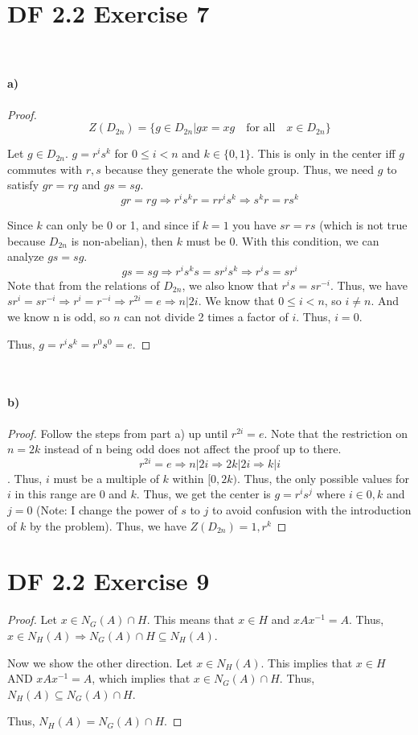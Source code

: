 \documentclass{article}
\begin{document}
\section{DF 2.2 Exercise 7}
~\paragraph{a)}
\begin{proof}
\[
Z(D_{2n}) = \{g \in D_{2n} | gx=xg \quad \textrm{for all} \quad x\in D_{2n}\}
\]

Let $g \in D_{2n}$. $g=r^is^k$ for $0 \leq i < n$ and $k \in \{0, 1\}$. This is only in the center iff $g$ commutes with $r, s$ because they generate the whole group. Thus, we need $g$ to satisfy $gr=rg$ and $gs=sg$.
\[
gr=rg \Rightarrow r^is^kr=rr^is^k \Rightarrow s^kr = rs^k
\]

Since $k$ can only be 0 or 1, and since if $k=1$ you have $sr = rs$ (which is not true because $D_{2n}$ is non-abelian), then $k$ must be 0. With this condition, we can analyze $gs=sg$.
\[
gs=sg \Rightarrow r^is^ks=sr^is^k \Rightarrow r^is=sr^i
\]
Note that from the relations of $D_{2n}$, we also know that $r^is=sr^{-i}$. Thus, we have $sr^i=sr^{-i} \Rightarrow r^i=r^{-i} \Rightarrow r^{2i}=e \Rightarrow n|2i$. We know that $0\leq i < n$, so $i\neq n$. And we know n is odd, so $n$ can not divide 2 times a factor of $i$. Thus, $i=0$.

Thus, $g=r^is^k=r^0s^0=e$.
\end{proof}
~\paragraph{b)}
\begin{proof}
Follow the steps from part a) up until $r^{2i} = e$. Note that the restriction on $n=2k$ instead of n being odd does not affect the proof up to there. 
\[r^{2i} = e \Rightarrow n|2i \Rightarrow 2k|2i \Rightarrow k|i\]. 
Thus, $i$ must be a multiple of $k$ within $[0, 2k)$. Thus, the only possible values for $i$ in this range are 0 and $k$. Thus, we get the center is $g=r^is^j$ where $i \in {0, k}$ and $j=0$ (Note: I change the power of $s$ to $j$ to avoid confusion with the introduction of $k$ by the problem).
Thus, we have $Z(D_{2n})={1, r^k}$
\end{proof}

\section{DF 2.2 Exercise 9}
\begin{proof}
Let $x \in N_G(A) \cap H$. This means that $x \in H$ and $xAx^{-1}=A$. Thus, $x \in N_H(A) \Rightarrow N_G(A)\cap H \subseteq N_H(A)$. 

Now we show the other direction. Let $x \in N_H(A)$. This implies that $x \in H$ AND $xAx^{-1}=A$, which implies that $x \in N_G(A) \cap H$. Thus, $N_H(A) \subseteq N_G(A)\cap H$.

Thus, $N_H(A) = N_G(A)\cap H$.
\end{proof}
\end{document}

